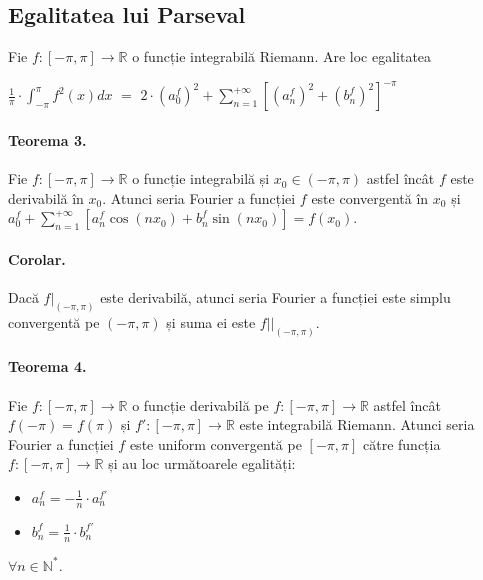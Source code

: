\subsection{Egalitatea lui Parseval}
Fie $f:[-\pi, \pi] \rightarrow \mathbb{R}$ o funcție integrabilă Riemann.
Are loc egalitatea

$\displaystyle\frac{1}{\pi} \cdot \displaystyle\int_{-\pi}^{\pi}f^{2}(x)dx$ $=$ $2 \cdot (a_{0}^{f})^{2} + \displaystyle\sum_{n=1}^{+\infty}[(a_{n}^{f})^{2}+(b_{n}^{f})^{2}]^{-\pi}$

\paragraph{Teorema 3.}
Fie $f:[-\pi, \pi] \rightarrow \mathbb{R}$ o funcție integrabilă și $x_{0} \in (-\pi, \pi)$ astfel încât $f$ este derivabilă în $x_{0}$. Atunci seria Fourier a funcției $f$ este
convergentă în $x_{0}$ și \\ 
$a_{0}^{f}+\displaystyle\sum_{n=1}^{+\infty}[a_{n}^{f}\cos(nx_{0}) + b_{n}^{f}\sin(nx_{0})] = f(x_{0})$.

\paragraph{Corolar.}
Dacă $f|_{(-\pi, \pi)}$ este derivabilă, atunci seria Fourier a funcției este simplu convergentă pe $(-\pi,\pi)$ și suma ei este $f||_{(-\pi, \pi)}$.

\paragraph{Teorema 4.}
Fie $f:[-\pi, \pi] \rightarrow \mathbb{R}$ o funcție derivabilă pe $f:[-\pi, \pi] \rightarrow \mathbb{R}$ astfel încât $f(-\pi) = f(\pi)$ și $f':[-\pi, \pi] \rightarrow \mathbb{R}$
este integrabilă Riemann. Atunci seria Fourier a funcției $f$ este uniform convergentă pe $[-\pi, \pi]$ către funcția $f:[-\pi, \pi] \rightarrow \mathbb{R}$ și au loc următoarele egalități:
\begin{itemize}
	\item $a_{n}^{f} = -\frac{1}{n} \cdot a_{n}^{f'}$
	\item $b_{n}^{f} = \frac{1}{n} \cdot b_{n}^{f'}$
\end{itemize}
$\forall n \in \mathbb{N}^{*}$.
